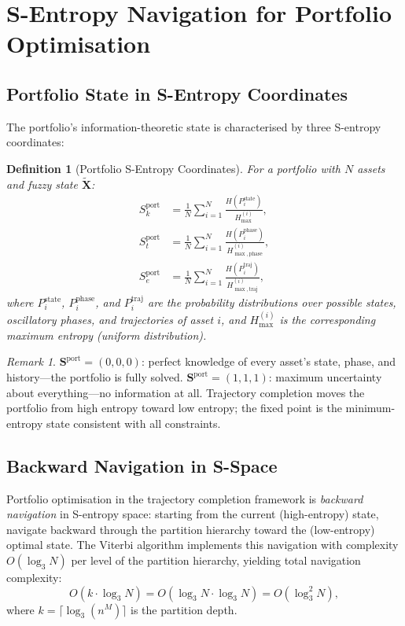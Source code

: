 \documentclass[twocolumn,10pt]{article}
\newtheorem{definition}[theorem]{Definition}
\theoremstyle{remark}
\newtheorem{remark}[theorem]{Remark}
\newcommand{\fuzzy}[1]{\tilde{#1}}
\begin{document}
\section{S-Entropy Navigation for Portfolio Optimisation}
\label{sec:sentropy}

\subsection{Portfolio State in S-Entropy Coordinates}

The portfolio's information-theoretic state is characterised by three S-entropy coordinates:

\begin{definition}[Portfolio S-Entropy Coordinates]
\label{def:portfolio_sentropy}
For a portfolio with $N$ assets and fuzzy state $\fuzzy{\mathbf{X}}$:
\begin{align}
    S_k^{\text{port}} &= \frac{1}{N} \sum_{i=1}^N \frac{H(P_i^{\text{state}})}{H_{\max}^{(i)}}, \label{eq:port_sk} \\
    S_t^{\text{port}} &= \frac{1}{N} \sum_{i=1}^N \frac{H(P_i^{\text{phase}})}{H_{\max,\text{phase}}^{(i)}}, \label{eq:port_st} \\
    S_e^{\text{port}} &= \frac{1}{N} \sum_{i=1}^N \frac{H(P_i^{\text{traj}})}{H_{\max,\text{traj}}^{(i)}}, \label{eq:port_se}
\end{align}
where $P_i^{\text{state}}$, $P_i^{\text{phase}}$, and $P_i^{\text{traj}}$ are the probability distributions over possible states, oscillatory phases, and trajectories of asset $i$, and $H_{\max}^{(i)}$ is the corresponding maximum entropy (uniform distribution).
\end{definition}

\begin{remark}
$\mathbf{S}^{\text{port}} = (0, 0, 0)$: perfect knowledge of every asset's state, phase, and history---the portfolio is fully solved.  $\mathbf{S}^{\text{port}} = (1, 1, 1)$: maximum uncertainty about everything---no information at all.  Trajectory completion moves the portfolio from high entropy toward low entropy; the fixed point is the minimum-entropy state consistent with all constraints.
\end{remark}

\subsection{Backward Navigation in S-Space}

Portfolio optimisation in the trajectory completion framework is \emph{backward navigation} in S-entropy space: starting from the current (high-entropy) state, navigate backward through the partition hierarchy toward the (low-entropy) optimal state.  The Viterbi algorithm implements this navigation with complexity $O(\log_3 N)$ per level of the partition hierarchy, yielding total navigation complexity:
\begin{equation}
    O(k \cdot \log_3 N) = O(\log_3 N \cdot \log_3 N) = O(\log_3^2 N),
    \label{eq:navigation_complexity}
\end{equation}
where $k = \lceil \log_3(n^M) \rceil$ is the partition depth.
\end{document}
